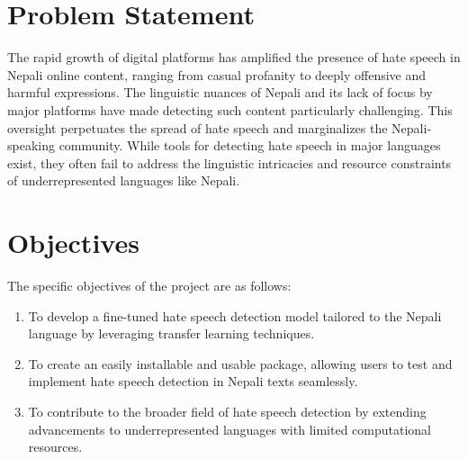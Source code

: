 \section{Problem Statement}
The rapid growth of digital platforms has amplified the presence of hate speech in Nepali online content, ranging from casual profanity to deeply offensive and harmful expressions. The linguistic nuances of Nepali and its lack of focus by major platforms have made detecting such content particularly challenging. This oversight perpetuates the spread of hate speech and marginalizes the Nepali-speaking community. While tools for detecting hate speech in major languages exist, they often fail to address the linguistic intricacies and resource constraints of underrepresented languages like Nepali.%
\section{Objectives}
The specific objectives of the project are as follows:
\begin{enumerate}[label=\roman*]
    \item To develop a fine-tuned hate speech detection model tailored to the Nepali language by leveraging transfer learning techniques.
    \item To create an easily installable and usable package, allowing users to test and implement hate speech detection in Nepali texts seamlessly.
	\item To contribute to the broader field of hate speech detection by extending advancements to underrepresented languages with limited computational resources.
\end{enumerate}

